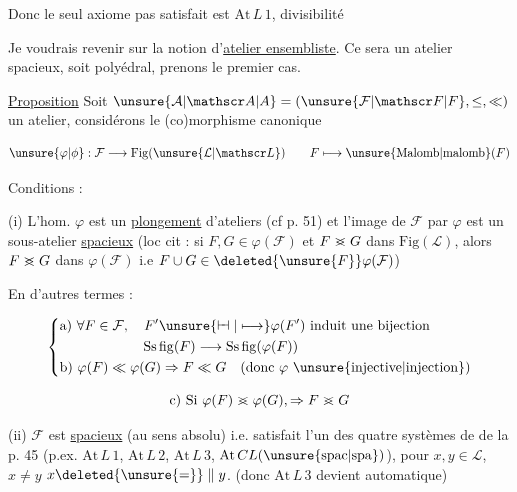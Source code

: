 Donc le seul axiome pas satisfait est $\mathrm{At}\,L\,1$, divisibilité



Je voudrais revenir sur la notion d'\uline{atelier ensembliste}. Ce sera un atelier  spacieux, soit polyédral, prenons le premier cas.

\uline{Proposition} Soit $\unsure{\mathcal A|\mathscr A|A}=(\unsure{\mathcal F|\mathscr F|F},\leq,\ll)$ un atelier, considérons le (co)morphisme canonique

\[
\unsure{\varphi|\phi}:\mathcal F\longrightarrow\mathrm{Fig}(\unsure{\mathcal L|\mathscr L})\qquad F\longmapsto\unsure{\mathrm{Malomb}|\mathrm{malomb}}(F)
\]

 Conditions : 

(i) L'hom. $\varphi$ est un \uline{plongement} d'ateliers (cf   p. 51) et l'image de $\mathcal F$ par $\varphi$ est un sous-atelier \uline{spacieux} (loc cit  : si $F,G\in\varphi(\mathcal F)$ et $F\mathrel{>\mkern-13mu<}G$  dans $\mathrm{Fig}(\mathcal L)$, alors $F\mathrel{>\mkern-13mu<}G$ dans $\varphi(\mathcal F)$ i.e $F\cup G\in\deleted{\unsure{F}}\varphi(\mathcal F)$)

En d'autres termes :


\[
\left\{\begin{aligned}
&\text{a) }\forall F\in\mathcal F,\quad F'\unsure{\mathrel{\vdash\mkern-6mu\dashv}|\longmapsto}\varphi(F')\ \text{induit une bijection}\\
&\hspace{6em}\mathrm{Ss\,fig}(F)\longrightarrow\mathrm{Ss\,fig}(\varphi(F))\\
&\text{b) }\varphi(F)\ll\varphi(G)\Rightarrow F\ll G\quad(\text{donc }\varphi\ \text{\unsure{injective|injection}})
\end{aligned}\right.
\]


\[
\text{c) Si }\varphi(F)\mathrel{>\mkern-13mu<}\varphi(G),\Rightarrow F\mathrel{>\mkern-13mu<}G
\]

(ii) $\mathcal F$ est \uline{spacieux} (au sens absolu) i.e. satisfait  l'un des quatre systèmes  de  de la p. 45  (p.ex. $\mathrm{At}\,L\,1$, $\mathrm{At}\,L\,2$, $\mathrm{At}\,L\,3$, $\mathrm{At}\,CL(\unsure{\mathrm{spac}|\mathrm{spa}})$),  pour $x,y\in\mathcal L$, $x\ne y$ \inserted{$\Rightarrow$} $x\deleted{\unsure{=}}\parallel y$. (donc $\mathrm{At}\,L\,3$ devient automatique)

